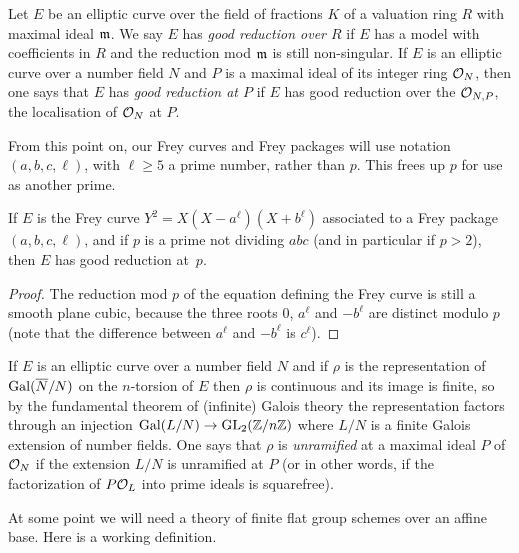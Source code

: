 \begin{definition}\label{EllipticCurve.GoodReduction} Let $E$ be an elliptic curve over the field of fractions $K$ of a valuation ring $R$ with maximal ideal $\mathfrak{m}$. We say $E$ has \emph{good reduction over $R$} if $E$ has a model with 
coefficients in $R$ and the reduction mod $\mathfrak{m}$ is still non-singular. If $E$ is an elliptic curve 
over a number field $N$ and $P$ is a maximal ideal of its integer ring $\mathcal{O}_N$, then one says that $E$ has \emph{good reduction at $P$} if $E$ has good reduction over the $\mathcal{O}_{N,P}$, the localisation of $\mathcal{O}_N$ at $P$.
\end{definition}

\begin{remark} From this point on, our Frey curves and Frey packages will use notation $(a,b,c,\ell)$, with $\ell\geq 5$ a prime number, rather than $p$. This frees up $p$ for use as another prime.
\end{remark}

\begin{lemma}\label{Frey_curve_good_reduction} If $E$ is the Frey curve $Y^2=X(X-a^\ell)(X+b^\ell)$ associated to a
  Frey package $(a,b,c,\ell)$, and if $p$ is a prime
  not dividing $abc$ (and in particular if $p>2$), then $E$ has good reduction at~$p$.
\end{lemma}
\begin{proof} The reduction mod $p$ of the equation defining the Frey curve is still a smooth
  plane cubic, because the three roots $0$, $a^\ell$ and $-b^\ell$ are distinct modulo $p$
  (note that the difference between $a^\ell$ and $-b^\ell$ is $c^\ell$). 
\end{proof}

If $E$ is an elliptic curve over a number field $N$ and if $\rho$ is the representation
of $\operatorname{Gal}(\overline{N}/N)$ on the $n$-torsion of $E$ then $\rho$ is continuous and its image is finite,
so by the fundamental theorem of (infinite) Galois theory the representation factors through an
injection $\operatorname{Gal}(L/N)\to\operatorname{GL}_2(\mathbb{Z}/n\mathbb{Z})$ where $L/N$ is a finite Galois extension of
number fields. One says that $\rho$ is \emph{unramified} at a maximal ideal $P$ of $\mathcal{O}_N$
if the extension $L/N$ is unramified at $P$ (or in other words, if the factorization
of $P\mathcal{O}_L$ into prime ideals is squarefree).

At some point we will need a theory of finite flat group schemes over an affine base. Here
is a working definition.

